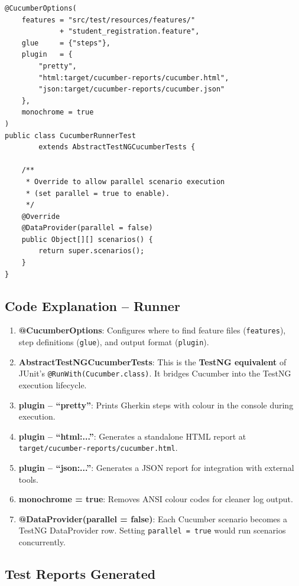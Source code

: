 \documentclass[12pt,a4paper]{article}
\begin{document}
\begin{lstlisting}[style=javastyle, caption={\texttt{CucumberRunnerTest.java} -- TestNG-based Cucumber runner}]
@CucumberOptions(
    features = "src/test/resources/features/"
             + "student_registration.feature",
    glue     = {"steps"},
    plugin   = {
        "pretty",
        "html:target/cucumber-reports/cucumber.html",
        "json:target/cucumber-reports/cucumber.json"
    },
    monochrome = true
)
public class CucumberRunnerTest
        extends AbstractTestNGCucumberTests {

    /**
     * Override to allow parallel scenario execution
     * (set parallel = true to enable).
     */
    @Override
    @DataProvider(parallel = false)
    public Object[][] scenarios() {
        return super.scenarios();
    }
}
\end{lstlisting}

\subsection{Code Explanation -- Runner}

\begin{enumerate}
    \item \textbf{@CucumberOptions}: Configures where to find feature files (\texttt{features}), step definitions (\texttt{glue}), and output format (\texttt{plugin}).
    \item \textbf{AbstractTestNGCucumberTests}: This is the \textbf{TestNG equivalent} of JUnit's \texttt{@RunWith(Cucumber.class)}. It bridges Cucumber into the TestNG execution lifecycle.
    \item \textbf{plugin -- ``pretty''}: Prints Gherkin steps with colour in the console during execution.
    \item \textbf{plugin -- ``html:...''}: Generates a standalone HTML report at \texttt{target/cucumber-reports/cucumber.html}.
    \item \textbf{plugin -- ``json:...''}: Generates a JSON report for integration with external tools.
    \item \textbf{monochrome = true}: Removes ANSI colour codes for cleaner log output.
    \item \textbf{@DataProvider(parallel = false)}: Each Cucumber scenario becomes a TestNG DataProvider row. Setting \texttt{parallel = true} would run scenarios concurrently.
\end{enumerate}

\subsection{Test Reports Generated}
\end{document}
